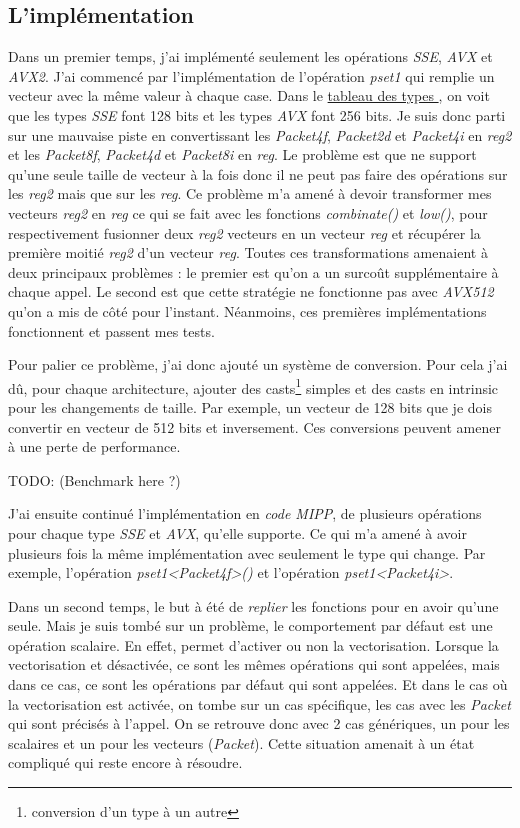 \subsection{L'implémentation}

Dans un premier temps, j'ai implémenté seulement les opérations \emph{SSE}, \emph{AVX} et
\emph{AVX2}.
J'ai commencé par l'implémentation de l'opération \emph{pset1} qui remplie un vecteur avec
la même valeur à chaque case. Dans le \hyperref[eigenTypesTable]{tableau des types \Eigen},
on voit que les types \emph{SSE} font 128 bits et les types \emph{AVX} font 256 bits. Je
suis donc parti sur une mauvaise piste en convertissant les \emph{Packet4f},
\emph{Packet2d} et \emph{Packet4i} en \emph{reg2} et les \emph{Packet8f}, \emph{Packet4d}
et \emph{Packet8i} en \emph{reg}. Le problème est que \MIPP ne support qu'une seule taille
de vecteur à la fois donc il ne peut pas faire des opérations sur les \emph{reg2} mais
que sur les \emph{reg}. Ce problème m'a amené à devoir transformer mes vecteurs \emph{reg2}
en \emph{reg} ce qui se fait avec les fonctions \emph{combinate()} et \emph{low()}, pour
respectivement fusionner deux \emph{reg2} vecteurs en un vecteur \emph{reg} et récupérer
la première moitié \emph{reg2} d'un vecteur \emph{reg}. Toutes ces transformations amenaient
à deux principaux problèmes :  le premier est qu'on a un surcoût supplémentaire à chaque
appel. Le second est que cette stratégie ne fonctionne pas avec \emph{AVX512} qu'on a
mis de côté pour l'instant. Néanmoins, ces premières implémentations fonctionnent et passent
mes tests.

Pour palier ce problème, j'ai donc ajouté un système de conversion. Pour cela j'ai dû, pour
chaque architecture, ajouter des casts\footnote{conversion d'un type à un autre} simples et
des casts en intrinsic pour les changements de taille. Par exemple, un vecteur de 128 bits
que je dois convertir en vecteur de 512 bits et inversement.
Ces conversions peuvent amener à une perte de performance.

TODO: (Benchmark here ?)

J'ai ensuite continué l'implémentation en \emph{code MIPP}, de plusieurs opérations pour
chaque type \emph{SSE} et \emph{AVX}, qu'elle supporte. Ce qui m'a amené à avoir plusieurs
fois la même implémentation \MIPP avec seulement le type qui change. Par exemple,
l'opération \emph{pset1<Packet4f>()} et l'opération \emph{pset1<Packet4i>}.

Dans un second temps, le but à été de \textit{replier} les fonctions pour en avoir qu'une
seule. Mais je suis tombé sur un problème, le comportement par défaut est une opération
scalaire. En effet, \Eigen permet d'activer ou non la vectorisation. Lorsque la
vectorisation et désactivée, ce sont les mêmes opérations qui sont appelées, mais dans ce cas,
ce sont les opérations par défaut qui sont appelées. Et dans le cas où la vectorisation est
activée, on tombe sur un cas spécifique, les cas avec les \emph{Packet} qui sont précisés
à l'appel. On se retrouve donc avec 2 cas génériques, un pour les scalaires
et un pour les vecteurs (\emph{Packet}). Cette situation amenait à un état compliqué qui
reste encore à résoudre.

